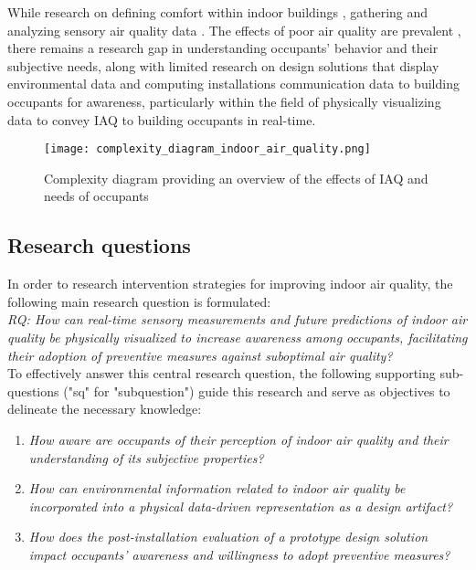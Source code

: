 While research on defining comfort within indoor buildings \cite{alavi_comfort_2017}, gathering and analyzing sensory air quality data \cite{corlan_importance_2021}. The effects of poor air quality are prevalent \cite{klepeis_national_2001}, there remains a research gap in understanding occupants' behavior and their subjective needs, along with limited research on design solutions that display environmental data and computing installations communication data to building occupants for awareness, particularly within the field of physically visualizing data to convey IAQ to building occupants in real-time. 

\begin{figure}[h]
    \centering
    \texttt{[image: complexity\_diagram\_indoor\_air\_quality.png]}
    \caption{Complexity diagram providing an overview of the effects of IAQ and needs of occupants \cite{schweizer_indoor_2007, wang_how_2021, kim_analyzing_2019, alavi_comfort_2017, corlan_importance_2021, klepeis_national_2001}}
    \label{fig:complexity}
\end{figure}


\subsection{Research questions}

In order to research intervention strategies for improving indoor air quality, the following main research question is formulated: \\

\emph{RQ: How can real-time sensory measurements and future predictions of indoor air quality be physically visualized to increase awareness among occupants, facilitating their adoption of preventive measures against suboptimal air quality?}\label{rq:1} \\

To effectively answer this central research question, the following supporting sub-questions ("sq" for "subquestion") guide this research and serve as objectives to delineate the necessary knowledge:

\begin{enumerate}
    \renewcommand{\labelenumi}{SQ\arabic{enumi}:}
    \item \emph{How aware are occupants of their perception of indoor air quality and their understanding of its subjective properties?}\label{subq:1}
    \item \emph{How can environmental information related to indoor air quality be incorporated into a physical data-driven representation as a design artifact?}\label{subq:2}
    \item \emph{How does the post-installation evaluation of a prototype design solution impact occupants' awareness and willingness to adopt preventive measures?}\label{subq:3}\\
\end{enumerate}